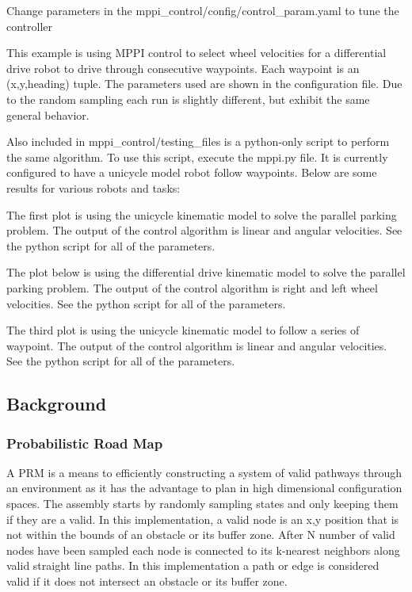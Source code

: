 \begin{DoxyItemize}
\item Change parameters in the mppi\+\_\+control/config/control\+\_\+param.\+yaml to tune the controller
\end{DoxyItemize}

This example is using M\+P\+PI control to select wheel velocities for a differential drive robot to drive through consecutive waypoints. Each waypoint is an (x,y,heading) tuple. The parameters used are shown in the configuration file. Due to the random sampling each run is slightly different, but exhibit the same general behavior.



Also included in {\ttfamily mppi\+\_\+control/testing\+\_\+files} is a python-\/only script to perform the same algorithm. To use this script, execute the {\ttfamily mppi.\+py} file. It is currently configured to have a unicycle model robot follow waypoints. Below are some results for various robots and tasks\+:

The first plot is using the unicycle kinematic model to solve the parallel parking problem. The output of the control algorithm is linear and angular velocities. See the python script for all of the parameters.



The plot below is using the differential drive kinematic model to solve the parallel parking problem. The output of the control algorithm is right and left wheel velocities. See the python script for all of the parameters.



The third plot is using the unicycle kinematic model to follow a series of waypoint. The output of the control algorithm is linear and angular velocities. See the python script for all of the parameters.



\subsection*{Background}

\subsubsection*{Probabilistic Road Map}

A P\+RM is a means to efficiently constructing a system of valid pathways through an environment as it has the advantage to plan in high dimensional configuration spaces. The assembly starts by randomly sampling states and only keeping them if they are a valid. In this implementation, a valid node is an x,y position that is not within the bounds of an obstacle or its buffer zone. After N number of valid nodes have been sampled each node is connected to it\textquotesingle{}s k-\/nearest neighbors along valid straight line paths. In this implementation a path or edge is considered valid if it does not intersect an obstacle or it\textquotesingle{}s buffer zone.

